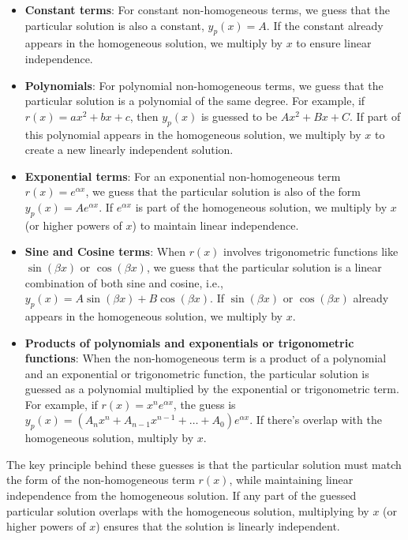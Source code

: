 \begin{itemize}
    \item \textbf{Constant terms}: For constant non-homogeneous terms, we guess that the particular solution is also a constant, \( y_p(x) = A \). If the constant already appears in the homogeneous solution, we multiply by \( x \) to ensure linear independence.
    
    \item \textbf{Polynomials}: For polynomial non-homogeneous terms, we guess that the particular solution is a polynomial of the same degree. For example, if \( r(x) = ax^2 + bx + c \), then \( y_p(x) \) is guessed to be \( A x^2 + B x + C \). If part of this polynomial appears in the homogeneous solution, we multiply by \( x \) to create a new linearly independent solution.
    
    \item \textbf{Exponential terms}: For an exponential non-homogeneous term \( r(x) = e^{\alpha x} \), we guess that the particular solution is also of the form \( y_p(x) = A e^{\alpha x} \). If \( e^{\alpha x} \) is part of the homogeneous solution, we multiply by \( x \) (or higher powers of \( x \)) to maintain linear independence.
    
    \item \textbf{Sine and Cosine terms}: When \( r(x) \) involves trigonometric functions like \( \sin(\beta x) \) or \( \cos(\beta x) \), we guess that the particular solution is a linear combination of both sine and cosine, i.e., \( y_p(x) = A \sin(\beta x) + B \cos(\beta x) \). If \( \sin(\beta x) \) or \( \cos(\beta x) \) already appears in the homogeneous solution, we multiply by \( x \).
    
    \item \textbf{Products of polynomials and exponentials or trigonometric functions}: When the non-homogeneous term is a product of a polynomial and an exponential or trigonometric function, the particular solution is guessed as a polynomial multiplied by the exponential or trigonometric term. For example, if \( r(x) = x^n e^{\alpha x} \), the guess is \( y_p(x) = (A_n x^n + A_{n-1} x^{n-1} + \dots + A_0) e^{\alpha x} \). If there's overlap with the homogeneous solution, multiply by \( x \).
\end{itemize}

\noindent The key principle behind these guesses is that the particular solution must match the form of the non-homogeneous term \( r(x) \), while maintaining linear independence from the homogeneous solution. If any part of the guessed particular solution overlaps with the homogeneous solution, multiplying by \( x \) (or higher powers of \( x \)) ensures that the solution is linearly independent.